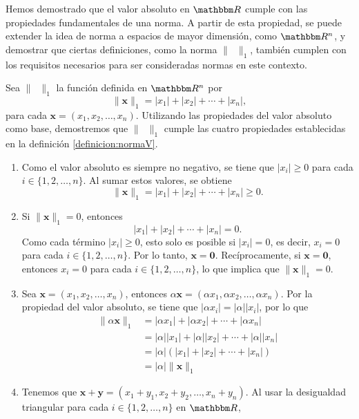 \newpage

Hemos demostrado que el valor absoluto en $\RR$ cumple con las propiedades fundamentales de una norma. A partir de esta propiedad, se puede extender la idea de norma a espacios de mayor dimensión, como $\RR[n]$, y demostrar que ciertas definiciones, como la norma $\| \phantom{x} \|_1$, también cumplen con los requisitos necesarios para ser consideradas normas en este contexto.

\begin{examplebox}{}{}
    Sea $\| \phantom{x} \|_1$ la función definida en $\RR[n]$ por
    $$\| \mathbf{x} \|_1 = |x_1| + |x_2| + \cdots + |x_n|,$$
    para cada $\mathbf{x} = (x_1, x_2, \dots, x_n)$. Utilizando las propiedades del valor absoluto como base, demostremos que $\| \phantom{x} \|_1$ cumple las cuatro propiedades establecidas en la definición \ref{definicion:normaV}.
    \begin{enumerate}[label=\roman*), topsep=6pt, itemsep=0pt]
        \item Como el valor absoluto es siempre no negativo, se tiene que $|x_i| \geq 0$ para cada $i \in \{ 1, 2, \dots, n \}$. Al sumar estos valores, se obtiene
        $$\| \mathbf{x} \|_1 = |x_1| + |x_2| + \cdots + |x_n| \geq 0.$$
        \item Si $\| \mathbf{x} \|_1 = 0$, entonces
        $$|x_1| + |x_2| + \cdots + |x_n| = 0.$$
        Como cada término $|x_i| \geq 0$, esto solo es posible si $|x_i| = 0$, es decir, $x_i = 0$ para cada $i \in \{ 1, 2, \dots, n \}$. Por lo tanto, $\mathbf{x} = \mathbf{0}$. Recíprocamente, si $\mathbf{x} = \mathbf{0}$, entonces $x_i = 0$ para cada $i \in \{ 1, 2, \dots, n \}$, lo que implica que $\| \mathbf{x} \|_1 = 0$.
        \item Sea $\mathbf{x} = (x_1, x_2, \dots, x_n)$, entonces $\alpha \mathbf{x} = (\alpha x_1, \alpha x_2, \dots, \alpha x_n)$. Por la propiedad del valor absoluto, se tiene que $|\alpha x_i| = |\alpha| |x_i|$, por lo que
        \begin{align*}
            \| \alpha \mathbf{x} \|_1 & = |\alpha x_1| + |\alpha x_2| + \cdots + |\alpha x_n| \\
            & = |\alpha| |x_1| + |\alpha| |x_2| + \cdots + |\alpha| |x_n| \\
            & = |\alpha| (|x_1| + |x_2| + \cdots + |x_n|) \\
            & = |\alpha| \| \mathbf{x} \|_1
        \end{align*}
        \item Tenemos que $\mathbf{x} + \mathbf{y} = (x_1 + y_1, x_2 + y_2, \dots, x_n + y_n)$. Al usar la desigualdad triangular para cada $i \in \{ 1, 2, \dots, n \}$ en $\RR$,

\end{enumerate}
\end{examplebox}
